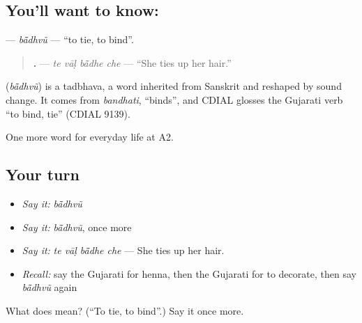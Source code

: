 \subsection*{You'll want to know: }
\textbf{} — \emph{bā̃dhvũ} — \textquotedblleft{}to tie, to bind\textquotedblright{}.

\begin{quote}
\textbf{   .} — \emph{te vāḷ bā̃dhe che} — \textquotedblleft{}She ties up her hair.\textquotedblright{}
\end{quote}

\begin{cousinweb}
\textbf{} (\emph{bā̃dhvũ}) is a tadbhava, a word inherited from Sanskrit and reshaped by sound change. It comes from \emph{bandhati}, \textquotedblleft{}binds\textquotedblright{}, and CDIAL glosses the Gujarati verb \textquotedblleft{}to bind, tie\textquotedblright{} (CDIAL 9139).
\end{cousinweb}

\begin{grammarlens}[title={What you've built}]
One more word for everyday life at A2.
\end{grammarlens}

\subsection*{Your turn}
\begin{itemize}
\raggedright
  \item \emph{Say it:} \emph{bā̃dhvũ}
  \item \emph{Say it:} \emph{bā̃dhvũ}, once more
  \item \emph{Say it:} \emph{te vāḷ bā̃dhe che} — She ties up her hair.
  \item \emph{Recall:} say the Gujarati for henna, then the Gujarati for to decorate, then say \emph{bā̃dhvũ} again
\end{itemize}

\begin{tcolorbox}[breakable,colback=teal!4,colframe=teal!35!black,title={Before you move on}]
What does  mean? (\textquotedblleft{}To tie, to bind\textquotedblright{}.) Say it once more.
\end{tcolorbox}
